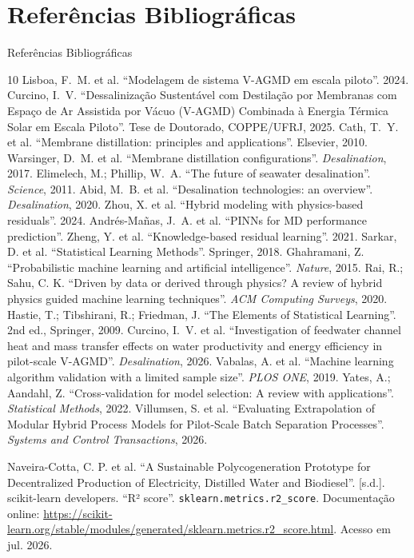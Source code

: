\documentclass[handout,10pt,aspectratio=169]{beamer}
\begin{document}
\section{Referências Bibliográficas}
\label{sec:referencias}
\begin{slideWithFrameBreaks}{Referências Bibliográficas}
\scriptsize
\begin{thebibliography}{10}
 Lisboa, F.~M. et al. ``Modelagem de sistema V-AGMD em escala piloto''. 2024.
 Curcino, I.~V. ``Dessalinização Sustentável com Destilação por Membranas com Espaço de Ar Assistida por Vácuo (V-AGMD) Combinada à Energia Térmica Solar em Escala Piloto''. Tese de Doutorado, COPPE/UFRJ, 2025.
 Cath, T.~Y. et al. ``Membrane distillation: principles and applications''. Elsevier, 2010.
 Warsinger, D.~M. et al. ``Membrane distillation configurations''. \textit{Desalination}, 2017.
 Elimelech, M.; Phillip, W.~A. ``The future of seawater desalination''. \textit{Science}, 2011.
 Abid, M.~B. et al. ``Desalination technologies: an overview''. \textit{Desalination}, 2020.
 Zhou, X. et al. ``Hybrid modeling with physics-based residuals''. 2024.
 Andr\'{e}s-Ma\~{n}as, J.~A. et al. ``PINNs for MD performance prediction''.
 Zheng, Y. et al. ``Knowledge-based residual learning''. 2021.
 Sarkar, D. et al. ``Statistical Learning Methods''. Springer, 2018.
 Ghahramani, Z. ``Probabilistic machine learning and artificial intelligence''. \textit{Nature}, 2015.
 Rai, R.; Sahu, C. K. ``Driven by data or derived through physics? A review of hybrid physics guided machine learning techniques''. \textit{ACM Computing Surveys}, 2020.
 Hastie, T.; Tibshirani, R.; Friedman, J. ``The Elements of Statistical Learning''. 2nd ed., Springer, 2009.
 Curcino, I.~V. et al. ``Investigation of feedwater channel heat and mass transfer effects on water productivity and energy efficiency in pilot-scale V-AGMD''. \textit{Desalination}, 2026.
 Vabalas, A. et al. ``Machine learning algorithm validation with a limited sample size''. \textit{PLOS ONE}, 2019.
 Yates, A.; Aandahl, Z. ``Cross-validation for model selection: A review with applications''. \textit{Statistical Methods}, 2022.
 Villumsen, S. et al. ``Evaluating Extrapolation of Modular Hybrid Process Models for Pilot-Scale Batch Separation Processes''. \textit{Systems and Control Transactions}, 2026.

 Naveira-Cotta, C. P. et al. ``A Sustainable Polycogeneration Prototype for Decentralized Production of Electricity, Distilled Water and Biodiesel''. [s.d.].
 {\sc scikit-learn} developers. ``R² score''. \texttt{sklearn.metrics.r2\_score}. Documenta\c{c}\~{a}o online: \url{https://scikit-learn.org/stable/modules/generated/sklearn.metrics.r2\_score.html}. Acesso em jul. 2026.
\end{thebibliography}
\end{slideWithFrameBreaks}
\end{document}
